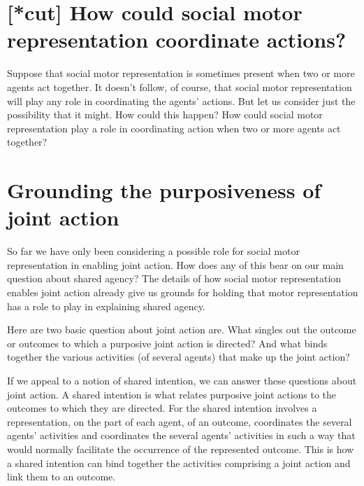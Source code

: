 \documentclass[12pt,\papersize]{extarticle}
\begin{document}
\section{[*cut] How could social motor representation coordinate actions?}
Suppose that social motor representation is sometimes present when two or more agents act together.
It doesn't follow, of course, that social motor representation will play any role in coordinating the agents' actions.
But let us consider just the possibility that it might.
How could this happen?
How could social motor representation play a role in coordinating action when two or more agents act together?


\section{Grounding the purposiveness of joint action}
So far we have only been considering a possible role for social motor representation in enabling joint action.  
How does any of this bear on our main question about shared agency?
The details of how 
social motor representation enables joint action
 already give us grounds for holding that motor representation has a role to play in explaining shared agency.

Here are two basic question about  joint action are.
What singles out the outcome or outcomes to which a purposive joint action is directed?
And what binds together the various activities (of several agents) that make up the joint action?

If we appeal to a notion of shared intention,
we can answer these questions about joint action.
A shared intention is what relates purposive joint actions to the outcomes to which they are directed.
For the shared intention 
involves a representation, on the part of each agent, of an outcome,
coordinates the several agents’ activities
and 
coordinates the several agents’ activities in such a way that would normally facilitate the occurrence of the represented outcome.
This is how a shared intention can bind together the activities comprising a joint action and link them to an outcome.

\end{document}
